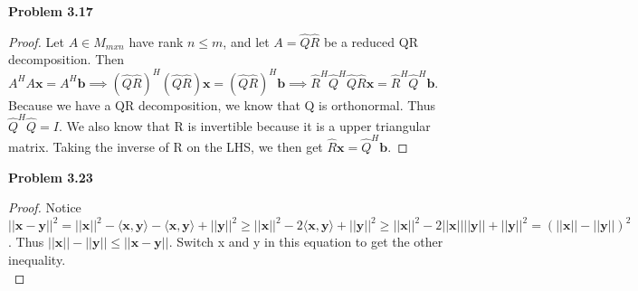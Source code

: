 \documentclass[letterpaper,12pt]{article}
\theoremstyle{definition}
\begin{document}
\vspace{5mm}

\noindent\textbf{Problem 3.17}\\
\begin{proof}
Let $A \in M_{mxn}$ have rank $n \leq m$, and let $A =  \hat{Q}\hat{R}$ be a reduced QR decomposition.  Then $A^HA\boldsymbol{x} = A^H\boldsymbol{b} \implies (\hat{Q}\hat{R})^H(\hat{Q}\hat{R})\boldsymbol{x} = (\hat{Q}\hat{R})^H\boldsymbol{b} \implies \hat{R}^H\hat{Q}^H\hat{Q}\hat{R}\boldsymbol{x} = \hat{R}^H\hat{Q}^H\boldsymbol{b}$.  Because we have a QR decomposition, we know that Q is orthonormal.  Thus $\hat{Q}^H\hat{Q} = I$.  We also know that R is invertible because it is a upper triangular matrix. Taking the inverse of R on the LHS, we then get $\hat{R}\boldsymbol{x} = \hat{Q}^H\boldsymbol{b}$.
\end{proof}

\vspace{5mm}

\noindent\textbf{Problem 3.23}\\
\begin{proof}
Notice $||\mathbf{x} - \mathbf{y}||^2 = ||\mathbf{x}||^2 - \langle\mathbf{x},\mathbf{y}\rangle - \langle \mathbf{x}, \mathbf{y}\rangle + ||\mathbf{y}||^2 \geq ||\mathbf{x}||^2 - 2\langle \mathbf{x}, \mathbf{y} \rangle + ||\mathbf{y}||^2 \geq ||\mathbf{x}||^2 - 2||\mathbf{x}||||\mathbf{y}|| + ||\mathbf{y}||^2 = (||\mathbf{x}|| - ||\mathbf{y}||)^2$.  Thus $||\mathbf{x}|| - ||\mathbf{y}|| \leq ||\mathbf{x}-\mathbf{y}||$.  Switch x and y in this equation to get the other inequality.\\
\end{proof}

\vspace{5mm}
\end{document}
